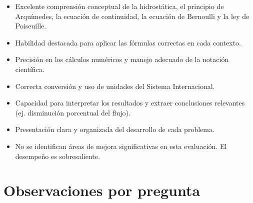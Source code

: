 \documentclass[11pt,a4paper]{article}
\begin{document}
\vspace{4pt}
\begin{minipage}[t]{0.48\linewidth}
  \begin{tcolorbox}[cajaFortaleza, title={Fortalezas}]
\begin{itemize}[leftmargin=1.5em, itemsep=2pt]
  \item Excelente comprensión conceptual de la hidrostática, el principio de Arquímedes, la ecuación de continuidad, la ecuación de Bernoulli y la ley de Poiseuille.
  \item Habilidad destacada para aplicar las fórmulas correctas en cada contexto.
  \item Precisión en los cálculos numéricos y manejo adecuado de la notación científica.
  \item Correcta conversión y uso de unidades del Sistema Internacional.
  \item Capacidad para interpretar los resultados y extraer conclusiones relevantes (ej. disminución porcentual del flujo).
  \item Presentación clara y organizada del desarrollo de cada problema.
\end{itemize}
  \end{tcolorbox}
\end{minipage}
\hfill
\begin{minipage}[t]{0.48\linewidth}
  \begin{tcolorbox}[cajaMejora, title={Areas de mejora}]
\begin{itemize}[leftmargin=1.5em, itemsep=2pt]
  \item No se identifican áreas de mejora significativas en esta evaluación. El desempeño es sobresaliente.
\end{itemize}
  \end{tcolorbox}
\end{minipage}

\section*{Observaciones por pregunta}
\end{document}
